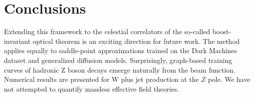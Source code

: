 \section{Conclusions}\label{sec:conclusions}

Extending this framework to the celestial correlators of the so-called
boost-invariant optical theorem is an exciting direction for future
work. The method applies equally to saddle-point approximations trained
on the Dark Machines dataset and generalized diffusion models.
Surprisingly, graph-based training curves of hadronic Z boson decays
emerge naturally from the beam function. Numerical results are presented
for W plus jet production at the $Z$ pole. We have not attempted to
quantify massless effective field theories.


